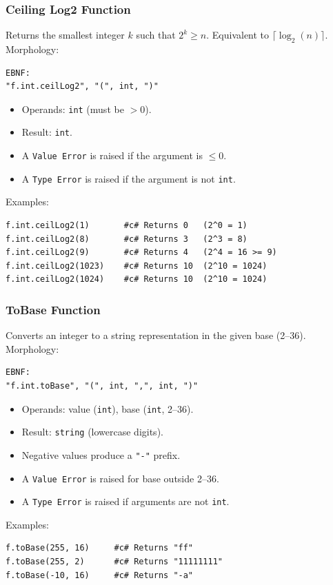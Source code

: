 \subsubsection{Ceiling Log2 Function}
Returns the smallest integer $k$ such that $2^k \geq n$. Equivalent to $\lceil \log_2(n) \rceil$. \\
Morphology:
\begin{verbatim}
EBNF:
"f.int.ceilLog2", "(", int, ")"
\end{verbatim}
\begin{itemize}
\item Operands: \texttt{int} (must be $> 0$).
\item Result: \texttt{int}.
\item A \texttt{Value Error} is raised if the argument is $\leq 0$.
\item A \texttt{Type Error} is raised if the argument is not \texttt{int}.
\end{itemize}
Examples:
\begin{verbatim}
f.int.ceilLog2(1)       #c# Returns 0   (2^0 = 1)
f.int.ceilLog2(8)       #c# Returns 3   (2^3 = 8)
f.int.ceilLog2(9)       #c# Returns 4   (2^4 = 16 >= 9)
f.int.ceilLog2(1023)    #c# Returns 10  (2^10 = 1024)
f.int.ceilLog2(1024)    #c# Returns 10  (2^10 = 1024)
\end{verbatim}

\subsubsection{ToBase Function}
Converts an integer to a string representation in the given base (2--36). \\
Morphology:
\begin{verbatim}
EBNF:
"f.int.toBase", "(", int, ",", int, ")"
\end{verbatim}
\begin{itemize}
\item Operands: value (\texttt{int}), base (\texttt{int}, 2--36).
\item Result: \texttt{string} (lowercase digits).
\item Negative values produce a \texttt{"-"} prefix.
\item A \texttt{Value Error} is raised for base outside 2--36.
\item A \texttt{Type Error} is raised if arguments are not \texttt{int}.
\end{itemize}
Examples:
\begin{verbatim}
f.toBase(255, 16)     #c# Returns "ff"
f.toBase(255, 2)      #c# Returns "11111111"
f.toBase(-10, 16)     #c# Returns "-a"
\end{verbatim}

